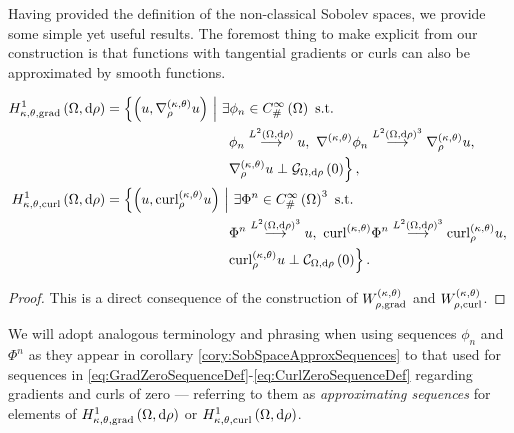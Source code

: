 Having provided the definition of the non-classical Sobolev spaces, we provide some simple yet useful results.
The foremost thing to make explicit from our construction is that functions with tangential gradients or curls can also be approximated by smooth functions.
\begin{cory} \label{cory:SobSpaceApproxSequences}
	\begin{align*}
		\ktgradSob{\ddom}{\rho} &= \clbracs{ \bracs{u, \ktgrad_{\rho}u} \setVert \exists\phi_n\in\psmooth{\ddom} \text{ s.t. } \right. \\ 
		&\hspace{0.25\textwidth} \left. \phi_n\lconv{\ltwo{\ddom}{\rho}}u, \ \ktgrad\phi_n\lconv{\ltwo{\ddom}{\rho}^3}\ktgrad_{\rho}u, \right. \\
		&\hspace{0.25\textwidth} \left. \ktgrad_{\rho}u \perp \gradZero{\ddom}{\rho} }, \\
		\ktcurlSob{\ddom}{\rho} &= \clbracs{ \bracs{u, \ktcurl{\rho}u} \setVert \exists\Phi^n\in\psmooth{\ddom}^3 \text{ s.t. } \right. \\
		&\hspace{0.25\textwidth} \left. \Phi^n\lconv{\ltwo{\ddom}{\rho}^3}u, \ \ktcurl{}\Phi^n\lconv{\ltwo{\ddom}{\rho}^3}\ktcurl{\rho}u, \right. \\
		&\hspace{0.25\textwidth} \left. \ktcurl{\rho}u \perp \curlZero{\ddom}{\rho} }.
	\end{align*}
\end{cory}
\begin{proof}
	This is a direct consequence of the construction of $W^{\left( \kappa, \theta \right)}_{\rho,\mathrm{grad}}$ and $W^{\left( \kappa, \theta \right)}_{\rho,\mathrm{curl}}$.
\end{proof}
We will adopt analogous terminology and phrasing when using sequences $\phi_n$ and $\Phi^n$ as they appear in corollary \ref{cory:SobSpaceApproxSequences} to that used for sequences in \eqref{eq:GradZeroSequenceDef}-\eqref{eq:CurlZeroSequenceDef} regarding gradients and curls of zero --- referring to them as \emph{approximating sequences} for elements of $H^1_{\kappa,\theta,\mathrm{grad}}\left( \Omega, \mathrm{d}\rho \right)$ or $H^1_{\kappa,\theta,\mathrm{curl}}\left( \Omega, \mathrm{d}\rho \right)$.

